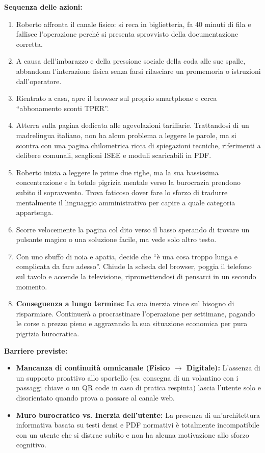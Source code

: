 \documentclass[11pt,a4paper]{article}
\begin{document}
\begin{tcolorbox}[colback=backgroundColor,colframe=borderColor,arc=2mm]
{    \textbf{Sequenza delle azioni:}
    \begin{enumerate}
        \item Roberto affronta il canale fisico: si reca in biglietteria, fa 40 minuti di fila e fallisce l'operazione perché si presenta sprovvisto della documentazione corretta.
        \item A causa dell'imbarazzo e della pressione sociale della coda alle sue spalle, abbandona l'interazione fisica senza farsi rilasciare un promemoria o istruzioni dall'operatore.
        \item Rientrato a casa, apre il browser sul proprio smartphone e cerca ``abbonamento sconti TPER''.
        \item Atterra sulla pagina dedicata alle agevolazioni tariffarie. Trattandosi di un madrelingua italiano, non ha alcun problema a leggere le parole, ma si scontra con una pagina chilometrica ricca di spiegazioni tecniche, riferimenti a delibere comunali, scaglioni ISEE e moduli scaricabili in PDF.
        \item Roberto inizia a leggere le prime due righe, ma la sua bassissima concentrazione e la totale pigrizia mentale verso la burocrazia prendono subito il sopravvento. Trova faticoso dover fare lo sforzo di tradurre mentalmente il linguaggio amministrativo per capire a quale categoria appartenga.
        \item Scorre velocemente la pagina col dito verso il basso sperando di trovare un pulsante magico o una soluzione facile, ma vede solo altro testo. 
        \item Con uno sbuffo di noia e apatia, decide che ``è una cosa troppo lunga e complicata da fare adesso''. Chiude la scheda del browser, poggia il telefono sul tavolo e accende la televisione, ripromettendosi di pensarci in un secondo momento.
        \item \textbf{Conseguenza a lungo termine:} La sua inerzia vince sul bisogno di risparmiare. Continuerà a procrastinare l'operazione per settimane, pagando le corse a prezzo pieno e aggravando la sua situazione economica per pura pigrizia burocratica.
    \end{enumerate}

    \textbf{Barriere previste:}
    \begin{itemize}
        \item \textbf{Mancanza di continuità omnicanale (Fisico $\rightarrow$ Digitale):} L'assenza di un supporto proattivo allo sportello (es. consegna di un volantino con i passaggi chiave o un QR code in caso di pratica respinta) lascia l'utente solo e disorientato quando prova a passare al canale web.
        \item \textbf{Muro burocratico vs. Inerzia dell'utente:} La presenza di un'architettura informativa basata su testi densi e PDF normativi è totalmente incompatibile con un utente che si distrae subito e non ha alcuna motivazione allo sforzo cognitivo.
    \end{itemize}

}
\end{tcolorbox}
\end{document}
